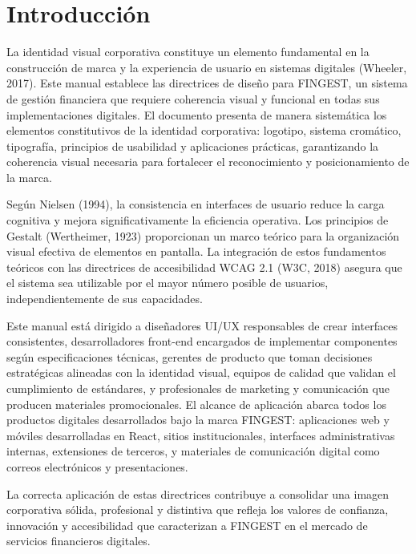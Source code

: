 \documentclass[12pt,a4paper,oneside]{article}
\begin{document}
\newpage
\tableofcontents
\newpage

\section{Introducción}

La identidad visual corporativa constituye un elemento fundamental en la construcción de marca y la experiencia de usuario en sistemas digitales (Wheeler, 2017). Este manual establece las directrices de diseño para FINGEST, un sistema de gestión financiera que requiere coherencia visual y funcional en todas sus implementaciones digitales. El documento presenta de manera sistemática los elementos constitutivos de la identidad corporativa: logotipo, sistema cromático, tipografía, principios de usabilidad y aplicaciones prácticas, garantizando la coherencia visual necesaria para fortalecer el reconocimiento y posicionamiento de la marca.

Según Nielsen (1994), la consistencia en interfaces de usuario reduce la carga cognitiva y mejora significativamente la eficiencia operativa. Los principios de Gestalt (Wertheimer, 1923) proporcionan un marco teórico para la organización visual efectiva de elementos en pantalla. La integración de estos fundamentos teóricos con las directrices de accesibilidad WCAG 2.1 (W3C, 2018) asegura que el sistema sea utilizable por el mayor número posible de usuarios, independientemente de sus capacidades.

Este manual está dirigido a diseñadores UI/UX responsables de crear interfaces consistentes, desarrolladores front-end encargados de implementar componentes según especificaciones técnicas, gerentes de producto que toman decisiones estratégicas alineadas con la identidad visual, equipos de calidad que validan el cumplimiento de estándares, y profesionales de marketing y comunicación que producen materiales promocionales. El alcance de aplicación abarca todos los productos digitales desarrollados bajo la marca FINGEST: aplicaciones web y móviles desarrolladas en React, sitios institucionales, interfaces administrativas internas, extensiones de terceros, y materiales de comunicación digital como correos electrónicos y presentaciones.

La correcta aplicación de estas directrices contribuye a consolidar una imagen corporativa sólida, profesional y distintiva que refleja los valores de confianza, innovación y accesibilidad que caracterizan a FINGEST en el mercado de servicios financieros digitales.
\end{document}
